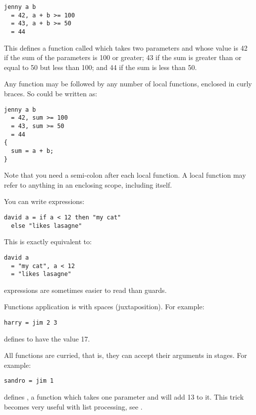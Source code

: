 \begin{verbatim}
jenny a b
  = 42, a + b >= 100
  = 43, a + b >= 50
  = 44
\end{verbatim}

\noindent
This defines a function called  which takes two parameters and whose
value is 42 if the sum of the parameters is 100 or greater; 43 if the sum is
greater than or equal to 50 but less than 100; and 44 if the sum is less than
50.

Any function may be followed by any number of local functions, enclosed in
curly braces. So  could be written as:

\begin{verbatim}
jenny a b
  = 42, sum >= 100
  = 43, sum >= 50
  = 44
{
  sum = a + b;
}
\end{verbatim}

\noindent
Note that you need a semi-colon after each local function.  A local function
may refer to anything in an enclosing scope, including itself.

You can write  expressions:

\begin{verbatim}
david a = if a < 12 then "my cat"
  else "likes lasagne"
\end{verbatim}

\noindent
This is exactly equivalent to:

\begin{verbatim}
david a
  = "my cat", a < 12
  = "likes lasagne"
\end{verbatim}

\noindent
{} expressions are sometimes easier to read than guards.

Functions application is with spaces (juxtaposition). For example:

\begin{verbatim}
harry = jim 2 3
\end{verbatim}

\noindent
defines  to have the value 17. 

All functions are curried, that is, they can accept their arguments in
stages. For example:

\begin{verbatim}
sandro = jim 1
\end{verbatim}

\noindent
defines , a function which takes one parameter and will add 13 to
it. This trick becomes very useful with list processing, see .


